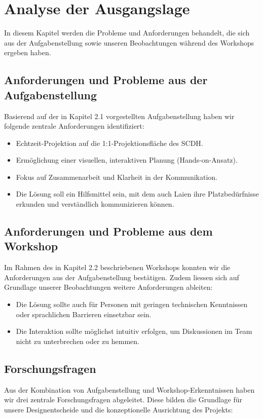 \section{Analyse der Ausgangslage}
In diesem Kapitel werden die Probleme und Anforderungen behandelt, die sich aus der Aufgabenstellung sowie unseren Beobachtungen während des Workshops ergeben haben.

\subsection{Anforderungen und Probleme aus der Aufgabenstellung}
Basierend auf der in Kapitel 2.1 vorgestellten Aufgabenstellung haben wir folgende zentrale Anforderungen identifiziert:

\begin{itemize}
  \item Echtzeit-Projektion auf die 1:1-Projektionsfläche des SCDH.
  \item Ermöglichung einer visuellen, interaktiven Planung (Hands-on-Ansatz).
  \item Fokus auf Zusammenarbeit und Klarheit in der Kommunikation.
  \item Die Lösung soll ein Hilfsmittel sein, mit dem auch Laien ihre Platzbedürfnisse erkunden und verständlich kommunizieren können.
\end{itemize}

\subsection{Anforderungen und Probleme aus dem Workshop}
Im Rahmen des in Kapitel 2.2 beschriebenen Workshops konnten wir die Anforderungen aus der Aufgabenstellung bestätigen. Zudem liessen sich auf Grundlage unserer Beobachtungen weitere Anforderungen ableiten:

\begin{itemize}
  \item Die Lösung sollte auch für Personen mit geringen technischen Kenntnissen oder sprachlichen Barrieren einsetzbar sein.
  \item Die Interaktion sollte möglichst intuitiv erfolgen, um Diskussionen im Team nicht zu unterbrechen oder zu hemmen.
\end{itemize}

\subsection{Forschungsfragen}
Aus der Kombination von Aufgabenstellung und Workshop-Erkenntnissen haben wir drei zentrale Forschungsfragen abgeleitet. Diese bilden die Grundlage für unsere Designentscheide und die konzeptionelle Ausrichtung des Projekts:

